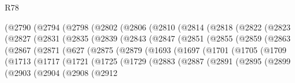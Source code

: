 \begin{lexlean}{R78}
\begin{coremodule}
          (@2790
            (@2794
              (@2798
                (@2802
                  (@2806
                    (@2810
                      (@2814
                        (@2818
                          (@2822
                            (@2823
                              (@2827
                                (@2831
                                  (@2835
                                    (@2839
                                      (@2843
                                        (@2847
                                          (@2851
                                            (@2855
                                              (@2859
                                                (@2863
                                                  (@2867
                                                    (@2871
                                                      (@627
                                                        (@2875
                                                          (@2879
                                                            (@1693
                                                              (@1697
                                                                (@1701
                                                                  (@1705
                                                                    (@1709
                                                                      (@1713
                                                                        (@1717
                                                                          (@1721
                                                                            (@1725
                                                                              (@1729
                                                                                (@2883
                                                                                  (@2887
                                                                                    (@2891
                                                                                      (@2895
                                                                                        (@2899
                                                                                          (@2903
                                                                                            (@2904
                                                                                              (@2908
                                                                                                (@2912

\end{coremodule}
\end{lexlean}
